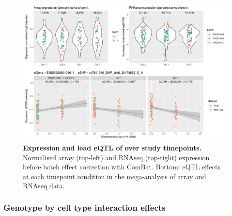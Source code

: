 \begin{figure}
    \centering
    \includegraphics[width=1.0\textwidth,page=1]{mainmatter/figures/chapter_03/plot_dge_eqtl_genotypes.ENSG00000104611,rs7841346_SNP_chr8_20170963_C_A.pdf}
    \caption{
        \textbf{Expression and lead \gls{eQTL} of  over study timepoints.}
        Normalised array (top-left) and \gls{RNAseq} (top-right) expression before batch effect correction with ComBat.
        Bottom: \gls{eQTL} effects at each timepoint condition in the mega-analysis of array and \gls{RNAseq} data.
    }
    \label{fig:hird_reQTL_ploteQTL_SH2D4A}
\end{figure}

\subsubsection{Genotype by cell type interaction effects}

